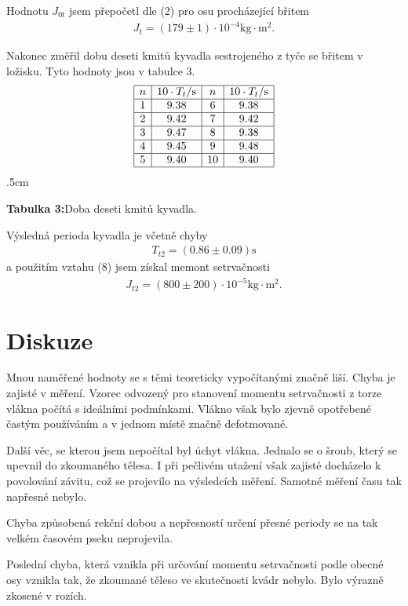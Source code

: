 \documentclass[a4paper,12pt]{article}
\begin{document}
Hodnotu $J_{0t}$ jsem přepočetl dle (2) pro osu procházející břitem
\begin{eqnarray}
	J_t=(179\pm1)\cdot 10^{-4} \mbox{kg}\cdot\mbox{m}^2.
\end{eqnarray}

Nakonec změřil dobu deseti kmitů kyvadla sestrojeného z tyče se břitem v ložisku. Tyto 
hodnoty jsou v tabulce 3.
\eject
$$ 
\begin{array}{|c|c|c|c|}
\hline
n&	10\cdot T_t/\mbox{s}&	n&	10\cdot T_t/\mbox{s}\\	\hline
1&	9.38&	6&	9.38 \\ \hline
2&	9.42&	7&	9.42 \\ \hline
3&	9.47&	8&	9.38 \\ \hline
4&	9.45&	9&	9.48 \\ \hline
5&	9.40&	10&	9.40 \\ \hline
\end{array}
$$
\vglue.5cm
\begin{center}
	\textbf{Tabulka 3:}Doba deseti kmitů kyvadla.
\end{center}
Výsledná perioda kyvadla je včetně chyby
\begin{eqnarray}
	T_{t2}=(0.86\pm0.09)\mbox{s}
\end{eqnarray}
a použitím vztahu (8) jsem získal memont setrvačnosti
\begin{eqnarray}
	J_{t2}=(800\pm200)\cdot 10^{-5} \mbox{kg}\cdot\mbox{m}^2.
\end{eqnarray}

\section{Diskuze}
\noindent
Mnou naměřené hodnoty se s těmi teoreticky vypočítanými značně liší. Chyba je zajisté 
v měření. Vzorec odvozený pro stanovení momentu setrvačnosti z torze vlákna počítá 
s ideálními podmínkami. Vlákno však bylo zjevně opotřebené častým používáním a v jednom 
místě značně defotmované. 

Další věc, se kterou jsem nepočítal byl úchyt vlákna. Jednalo 
se o šroub, který se upevnil do zkoumaného tělesa. I při pečlivém utažení však zajisté 
docházelo k povolování závitu, což se projevilo na výsledcích měření. Samotné měření 
času tak napřesné nebylo. 

Chyba způsobená rekční dobou a nepřesností určení přesné periody 
se na tak velkém časovém pseku neprojevila. 

Poslední chyba, která vznikla při určování 
momentu setrvačnosti podle obecné osy vznikla tak, že zkoumané těleso ve skutečnosti kvádr 
nebylo. Bylo výrazně zkosené v rozích.
\end{document}
